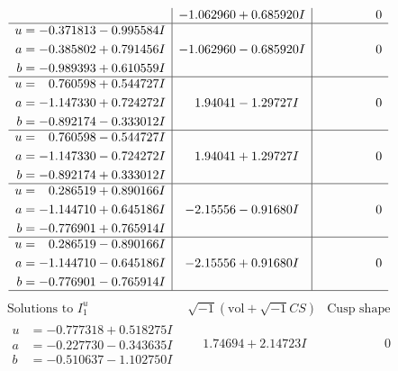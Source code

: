 \documentclass[1p]{elsarticle_modified}
\theoremstyle{definition}
\newcommand{\I}{\sqrt{-1}}
\begin{document}
$$\begin{array}{c|c|c}
 & -1.062960 + 0.685920 I & \phantom{-0.000000 } 0 \\ \hline\begin{aligned}
u &= -0.371813 - 0.995584 I \\
a &= -0.385802 + 0.791456 I \\
b &= -0.989393 + 0.610559 I\end{aligned}
 & -1.062960 - 0.685920 I & \phantom{-0.000000 } 0 \\ \hline\begin{aligned}
u &= \phantom{-}0.760598 + 0.544727 I \\
a &= -1.147330 + 0.724272 I \\
b &= -0.892174 - 0.333012 I\end{aligned}
 & \phantom{-}1.94041 - 1.29727 I & \phantom{-0.000000 } 0 \\ \hline\begin{aligned}
u &= \phantom{-}0.760598 - 0.544727 I \\
a &= -1.147330 - 0.724272 I \\
b &= -0.892174 + 0.333012 I\end{aligned}
 & \phantom{-}1.94041 + 1.29727 I & \phantom{-0.000000 } 0 \\ \hline\begin{aligned}
u &= \phantom{-}0.286519 + 0.890166 I \\
a &= -1.144710 + 0.645186 I \\
b &= -0.776901 + 0.765914 I\end{aligned}
 & -2.15556 - 0.91680 I & \phantom{-0.000000 } 0 \\ \hline\begin{aligned}
u &= \phantom{-}0.286519 - 0.890166 I \\
a &= -1.144710 - 0.645186 I \\
b &= -0.776901 - 0.765914 I\end{aligned}
 & -2.15556 + 0.91680 I & \phantom{-0.000000 } 0\\
 \hline 
 \end{array}$$\newpage$$\begin{array}{c|c|c}  
\text{Solutions to }I^u_{1}& \I (\text{vol} + \sqrt{-1}CS) & \text{Cusp shape}\\
 \hline 
\begin{aligned}
u &= -0.777318 + 0.518275 I \\
a &= -0.227730 - 0.343635 I \\
b &= -0.510637 - 1.102750 I\end{aligned}
 & \phantom{-}1.74694 + 2.14723 I & \phantom{-0.000000 } 0 \\ \hline\begin{aligned}

\end{aligned}
\end{array}$$
\end{document}

